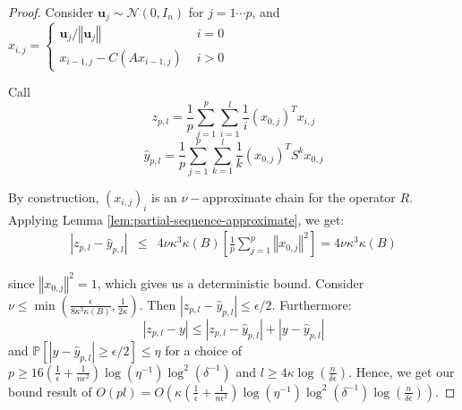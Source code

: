\begin{proof}

Consider $\mathbf{u}_{j}\sim\mathcal{N}\left(0,I_{n}\right)$ for
$j=1\cdots p$, and $x_{i,j}=\begin{cases}
\mathbf{u}_{j}/\left\Vert \mathbf{u}_{j}\right\Vert  & \,\, i=0\\
x_{i-1,j}-C\left(Ax_{i-1,j}\right) & \,\, i>0
\end{cases}$

Call 
\[
z_{p,l}=\frac{1}{p}\sum_{j=1}^{p}\sum_{i=1}^{l}\frac{1}{i}\left(x_{0,j}\right)^{T}x_{i,j}
\]
\[
\hat{y}_{p,l}=\frac{1}{p}\sum_{j=1}^{p}\sum_{k=1}^{l}\frac{1}{k}\left(x_{0,j}\right)^{T}S^{k}x_{0,j}
\]


By construction, $\left(x_{i,j}\right)_{i}$ is an $\nu-$approximate
chain for the operator $R$. Applying Lemma \ref{lem:partial-sequence-approximate},
we get:
\begin{eqnarray*}
\left|z_{p,l}-\hat{y}_{p,l}\right| & \leq & 4\nu\kappa^{3}\kappa\left(B\right)\left[\frac{1}{p}\sum_{j=1}^{p}\left\Vert x_{0,j}\right\Vert ^{2}\right]=4\nu\kappa^{3}\kappa\left(B\right)
\end{eqnarray*}


since $\left\Vert x_{0,j}\right\Vert ^{2}=1$, which gives us a deterministic
bound. Consider $\nu\leq\min\left(\frac{\epsilon}{8\kappa^{3}\kappa\left(B\right)},\frac{1}{2\kappa}\right)$.
Then $\left|z_{p,l}-\hat{y}_{p,l}\right|\leq\epsilon/2$. Furthermore:
\[
\left|z_{p,l}-y\right|\leq\left|z_{p,l}-\hat{y}_{p,l}\right|+\left|y-\hat{y}_{p,l}\right|
\]
and $\mathbb{P}\left[\left|y-\hat{y}_{p,l}\right|\geq\epsilon/2\right]\leq\eta$
for a choice of $p\geq16\left(\frac{1}{\epsilon}+\frac{1}{n\epsilon^{2}}\right)\log\left(\eta^{-1}\right)\log^{2}\left(\delta^{-1}\right)$
and $l\geq4\kappa\log\left(\frac{n}{\delta\epsilon}\right)$. Hence,
we get our bound result of $O\left(pl\right)=O\left(\kappa\left(\frac{1}{\epsilon}+\frac{1}{n\epsilon^{2}}\right)\log\left(\eta^{-1}\right)\log^{2}\left(\delta^{-1}\right)\log\left(\frac{n}{\delta\epsilon}\right)\right)$.

\end{proof}

